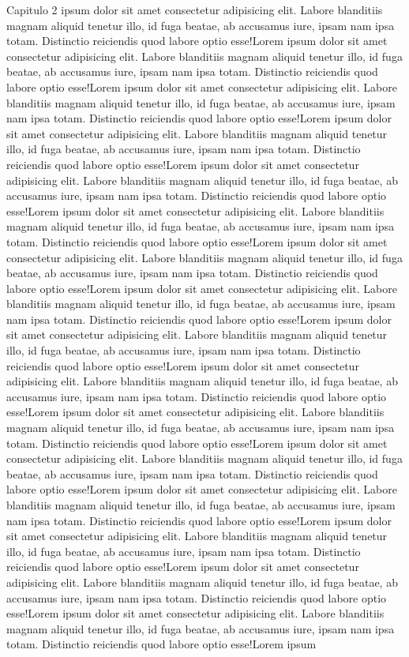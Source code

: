 \begin{capitulo}{Capitulo 2}
ipsum dolor sit amet consectetur adipisicing elit. Labore blanditiis magnam aliquid tenetur illo, id fuga beatae, ab accusamus iure, ipsam nam ipsa totam. Distinctio reiciendis quod labore optio esse!Lorem ipsum dolor sit amet consectetur adipisicing elit. Labore blanditiis magnam aliquid tenetur illo, id fuga beatae, ab accusamus iure, ipsam nam ipsa totam. Distinctio reiciendis quod labore optio esse!Lorem ipsum dolor sit amet consectetur adipisicing elit. Labore blanditiis magnam aliquid tenetur illo, id fuga beatae, ab accusamus iure, ipsam nam ipsa totam. Distinctio reiciendis quod labore optio esse!Lorem ipsum dolor sit amet consectetur adipisicing elit. Labore blanditiis magnam aliquid tenetur illo, id fuga beatae, ab accusamus iure, ipsam nam ipsa totam. Distinctio reiciendis quod labore optio esse!Lorem ipsum dolor sit amet consectetur adipisicing elit. Labore blanditiis magnam aliquid tenetur illo, id fuga beatae, ab accusamus iure, ipsam nam ipsa totam. Distinctio reiciendis quod labore optio esse!Lorem ipsum dolor sit amet consectetur adipisicing elit. Labore blanditiis magnam aliquid tenetur illo, id fuga beatae, ab accusamus iure, ipsam nam ipsa totam. Distinctio reiciendis quod labore optio esse!Lorem ipsum dolor sit amet consectetur adipisicing elit. Labore blanditiis magnam aliquid tenetur illo, id fuga beatae, ab accusamus iure, ipsam nam ipsa totam. Distinctio reiciendis quod labore optio esse!Lorem ipsum dolor sit amet consectetur adipisicing elit. Labore blanditiis magnam aliquid tenetur illo, id fuga beatae, ab accusamus iure, ipsam nam ipsa totam. Distinctio reiciendis quod labore optio esse!Lorem ipsum dolor sit amet consectetur adipisicing elit. Labore blanditiis magnam aliquid tenetur illo, id fuga beatae, ab accusamus iure, ipsam nam ipsa totam. Distinctio reiciendis quod labore optio esse!Lorem ipsum dolor sit amet consectetur adipisicing elit. Labore blanditiis magnam aliquid tenetur illo, id fuga beatae, ab accusamus iure, ipsam nam ipsa totam. Distinctio reiciendis quod labore optio esse!Lorem ipsum dolor sit amet consectetur adipisicing elit. Labore blanditiis magnam aliquid tenetur illo, id fuga beatae, ab accusamus iure, ipsam nam ipsa totam. Distinctio reiciendis quod labore optio esse!Lorem ipsum dolor sit amet consectetur adipisicing elit. Labore blanditiis magnam aliquid tenetur illo, id fuga beatae, ab accusamus iure, ipsam nam ipsa totam. Distinctio reiciendis quod labore optio esse!Lorem ipsum dolor sit amet consectetur adipisicing elit. Labore blanditiis magnam aliquid tenetur illo, id fuga beatae, ab accusamus iure, ipsam nam ipsa totam. Distinctio reiciendis quod labore optio esse!Lorem ipsum dolor sit amet consectetur adipisicing elit. Labore blanditiis magnam aliquid tenetur illo, id fuga beatae, ab accusamus iure, ipsam nam ipsa totam. Distinctio reiciendis quod labore optio esse!Lorem ipsum dolor sit amet consectetur adipisicing elit. Labore blanditiis magnam aliquid tenetur illo, id fuga beatae, ab accusamus iure, ipsam nam ipsa totam. Distinctio reiciendis quod labore optio esse!Lorem ipsum dolor sit amet consectetur adipisicing elit. Labore blanditiis magnam aliquid tenetur illo, id fuga beatae, ab accusamus iure, ipsam nam ipsa totam. Distinctio reiciendis quod labore optio esse!Lorem ipsum 
\end{capitulo}
